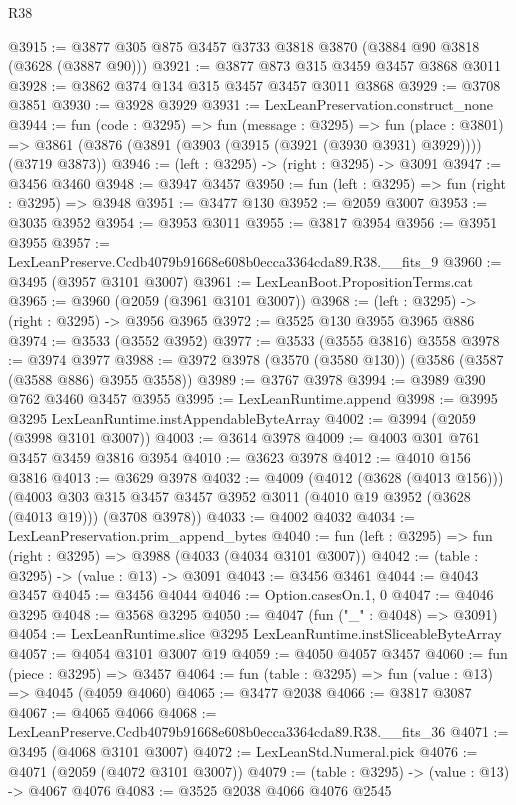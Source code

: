 \begin{lexlean}{R38}
\begin{coremodule}
@3915 := @3877 @305 @875 @3457 @3733 @3818 @3870 (@3884 @90 @3818 (@3628 (@3887 @90)))
@3921 := @3877 @873 @315 @3459 @3457 @3868 @3011
@3928 := @3862 @374 @134 @315 @3457 @3457 @3011 @3868
@3929 := @3708 @3851
@3930 := @3928 @3929
@3931 := LexLeanPreservation.construct_none
@3944 := fun (code : @3295) =>
  fun (message : @3295) =>
  fun (place : @3801) =>
  @3861 (@3876 (@3891 (@3903 (@3915 (@3921 (@3930 @3931) @3929)))) (@3719 @3873))
@3946 := (left : @3295) -> (right : @3295) -> @3091
@3947 := @3456 @3460
@3948 := @3947 @3457
@3950 := fun (left : @3295) => fun (right : @3295) => @3948
@3951 := @3477 @130
@3952 := @2059 @3007
@3953 := @3035 @3952
@3954 := @3953 @3011
@3955 := @3817 @3954
@3956 := @3951 @3955
@3957 := LexLeanPreserve.Ccdb4079b91668e608b0ecca3364cda89.R38.__fits_9
@3960 := @3495 (@3957 @3101 @3007)
@3961 := LexLeanBoot.PropositionTerms.cat
@3965 := @3960 (@2059 (@3961 @3101 @3007))
@3968 := (left : @3295) -> (right : @3295) -> @3956 @3965
@3972 := @3525 @130 @3955 @3965 @886
@3974 := @3533 (@3552 @3952)
@3977 := @3533 (@3555 @3816) @3558
@3978 := @3974 @3977
@3988 := @3972 @3978 (@3570 (@3580 @130)) (@3586 (@3587 (@3588 @886) @3955 @3558))
@3989 := @3767 @3978
@3994 := @3989 @390 @762 @3460 @3457 @3955
@3995 := LexLeanRuntime.append
@3998 := @3995 @3295 LexLeanRuntime.instAppendableByteArray
@4002 := @3994 (@2059 (@3998 @3101 @3007))
@4003 := @3614 @3978
@4009 := @4003 @301 @761 @3457 @3459 @3816 @3954
@4010 := @3623 @3978
@4012 := @4010 @156 @3816
@4013 := @3629 @3978
@4032 := @4009
    (@4012 (@3628 (@4013 @156)))
    (@4003 @303 @315 @3457 @3457 @3952 @3011 (@4010 @19 @3952 (@3628 (@4013 @19))) (@3708 @3978))
@4033 := @4002 @4032
@4034 := LexLeanPreservation.prim_append_bytes
@4040 := fun (left : @3295) => fun (right : @3295) => @3988 (@4033 (@4034 @3101 @3007))
@4042 := (table : @3295) -> (value : @13) -> @3091
@4043 := @3456 @3461
@4044 := @4043 @3457
@4045 := @3456 @4044
@4046 := Option.casesOn.{1, 0}
@4047 := @4046 @3295
@4048 := @3568 @3295
@4050 := @4047 (fun ("_" : @4048) => @3091)
@4054 := LexLeanRuntime.slice @3295 LexLeanRuntime.instSliceableByteArray
@4057 := @4054 @3101 @3007 @19
@4059 := @4050 @4057 @3457
@4060 := fun (piece : @3295) => @3457
@4064 := fun (table : @3295) => fun (value : @13) => @4045 (@4059 @4060)
@4065 := @3477 @2038
@4066 := @3817 @3087
@4067 := @4065 @4066
@4068 := LexLeanPreserve.Ccdb4079b91668e608b0ecca3364cda89.R38.__fits_36
@4071 := @3495 (@4068 @3101 @3007)
@4072 := LexLeanStd.Numeral.pick
@4076 := @4071 (@2059 (@4072 @3101 @3007))
@4079 := (table : @3295) -> (value : @13) -> @4067 @4076
@4083 := @3525 @2038 @4066 @4076 @2545

\end{coremodule}
\end{lexlean}
